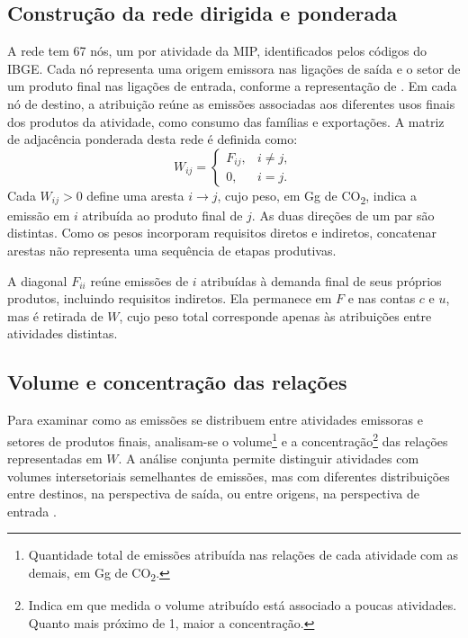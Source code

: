 \subsection{Construção da rede dirigida e ponderada}
\label{sec:construcao-rede}

A rede tem 67 nós, um por atividade da MIP, identificados pelos códigos do IBGE. Cada nó representa uma origem emissora nas ligações de saída e o setor de um produto final nas ligações de entrada, conforme a representação de \textcite{huang2019}. Em cada nó de destino, a atribuição reúne as emissões associadas aos diferentes usos finais dos produtos da atividade, como consumo das famílias e exportações. A matriz de adjacência ponderada desta rede é definida como:
\begin{equation}
W_{ij}=\begin{cases}
F_{ij}, & i\ne j,\\
0, & i=j.
\end{cases}
\label{eq:rede-sem-diagonal}
\end{equation}
Cada $W_{ij}>0$ define uma aresta $i\rightarrow j$, cujo peso, em Gg de CO\textsubscript{2}, indica a emissão em $i$ atribuída ao produto final de $j$. As duas direções de um par são distintas. Como os pesos incorporam requisitos diretos e indiretos, concatenar arestas não representa uma sequência de etapas produtivas.

A diagonal $F_{ii}$ reúne emissões de $i$ atribuídas à demanda final de seus próprios produtos, incluindo requisitos indiretos. Ela permanece em $F$ e nas contas $c$ e $u$, mas é retirada de $W$, cujo peso total corresponde apenas às atribuições entre atividades distintas.

\subsection{Volume e concentração das relações}
\label{sec:volume-concentracao}

Para examinar como as emissões se distribuem entre atividades emissoras e setores de produtos finais, analisam-se o volume\footnote{Quantidade total de emissões atribuída nas relações de cada atividade com as demais, em Gg de CO\textsubscript{2}.} e a concentração\footnote{Indica em que medida o volume atribuído está associado a poucas atividades. Quanto mais próximo de 1, maior a concentração.} das relações representadas em $W$. A análise conjunta permite distinguir atividades com volumes intersetoriais semelhantes de emissões, mas com diferentes distribuições entre destinos, na perspectiva de saída, ou entre origens, na perspectiva de entrada \parencite{huang2019,serrano2009}.

